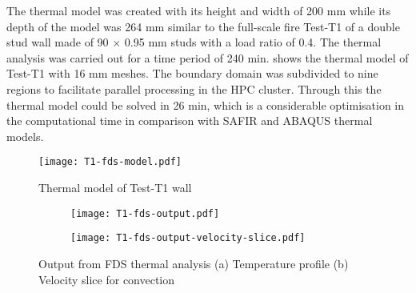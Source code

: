 The thermal model was created with its height and width of 200 mm while its depth of the model was 264 mm similar to the full-scale fire Test-T1 of a double stud wall made of 90 $\times$ 0.95 mm studs with a load ratio of 0.4. The thermal analysis was carried out for a time period of 240 min.  shows the thermal model of Test-T1 with 16 mm meshes. The boundary domain was  subdivided to nine regions to facilitate parallel processing in the HPC cluster. Through this the thermal model could be solved in 26 min, which is a considerable optimisation in the computational time in comparison with SAFIR and ABAQUS thermal models.   
\begin{figure}[!htbp]
	\centering
		\texttt{[image: T1-fds-model.pdf]}
		\caption{Thermal model of Test-T1 wall}
		\label{fig:T1-fds-model}
\end{figure}
\begin{figure}[!htbp]
	\centering
	\begin{subfigure}[b]{0.45\textwidth}
		\centering
		\texttt{[image: T1-fds-output.pdf]}
		\caption{}
		\label{subfig:T1-fds-output}
	\end{subfigure}
	\begin{subfigure}[b]{0.45\textwidth}
		\centering
		\texttt{[image: T1-fds-output-velocity-slice.pdf]}
		\caption{}
		\label{subfig:T1-fds-output-velocity-slice}
	\end{subfigure}
	   \caption{Output from FDS thermal analysis (a) Temperature profile (b) Velocity slice for convection}
	   \label{fig:fds-output-velocity}
\end{figure}

